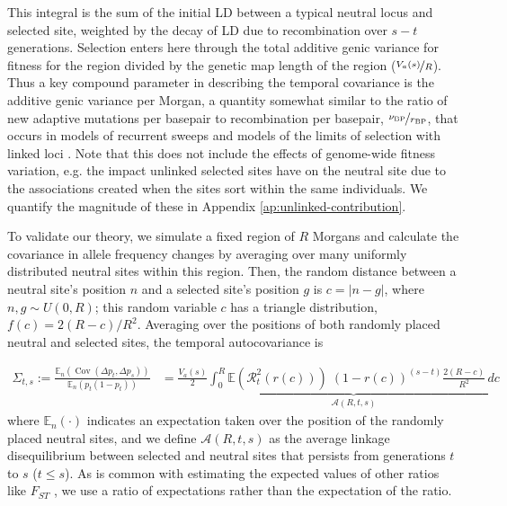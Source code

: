 \documentclass[11pt]{article}
\newcommand{\E}{\mathbb{E}}
\DeclareMathOperator{\cov}{Cov}
\begin{document}
This integral is the sum of the initial LD between a typical neutral locus and
selected site, weighted by the decay of LD due to recombination over $s-t$
generations. Selection enters here through the total additive genic variance
for fitness for the region divided by the genetic map length of the region
($\nicefrac{V_a(s)}{R}$). Thus a key compound parameter in describing the
temporal covariance is the additive genic variance per Morgan, a quantity
somewhat similar to the ratio of new adaptive mutations per basepair to
recombination per basepair, $\nicefrac{\nu_\text{BP}}{r_\text{BP}}$, that
occurs in models of recurrent sweeps \parencite{Stephan1992-jc} and models of
the limits of selection with linked loci
\parencite{Robertson1970-xk,Robertson1976-la}. Note that this does not include
the effects of genome-wide fitness variation, e.g. the impact unlinked selected
sites have on the neutral site due to the associations created when the sites
sort within the same individuals. We quantify the magnitude of these in
Appendix \ref{ap:unlinked-contribution}.


To validate our theory, we simulate a fixed region of $R$ Morgans and
calculate the covariance in allele frequency changes by averaging over many
uniformly distributed neutral sites within this region. Then, the random
distance between a neutral site's position $n$ and a selected site's position
$g$ is $c = |n - g|$, where $n, g \sim U(0, R)$; this random variable $c$ has a
triangle distribution, $f(c) = 2(R-c) / R^2$. Averaging over the positions of
both randomly placed neutral and selected sites, the temporal autocovariance
is

\begin{align}
  \label{eq:multilocus-triangle}
  \Sigma_{t,s} := \frac{\E_n(\cov(\Delta p_t, \Delta p_s))}{\E_n(p_{t} (1-p_{t}))} &= \frac{V_a(s)}{2} \underbrace{\int_0^R \E(\mathcal{R}_t^2(r(c))) \; (1-r(c))^{(s-t)} \frac{2(R-c)}{R^2} \,d c}_{\mathcal{A}(R, t, s)} 
\end{align}
%
where $\E_n(\cdot)$ indicates an expectation taken over the position of the
randomly placed neutral sites, and we define $\mathcal{A}(R, t, s)$ as the
average linkage disequilibrium between selected and neutral sites that persists
from generations $t$ to $s$ ($t \le s$). As is common with estimating the
expected values of other ratios like $F_{ST}$ \parencite{Bhatia2013-zy}, we use
a ratio of expectations rather than the expectation of the ratio.
\end{document}
